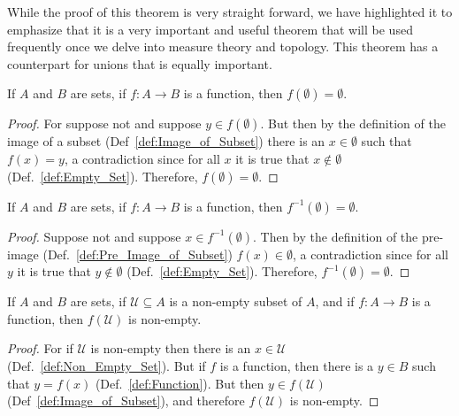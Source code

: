     While the proof of this theorem is very straight forward, we have
    highlighted it to emphasize that it is a very important and useful theorem
    that will be used frequently once we delve into measure theory and topology.
    This theorem has a counterpart for unions that is equally important.
    \begin{theorem}
        \label{thm:Image_of_Empty_Set_Is_Empty}%
        If $A$ and $B$ are sets, if $f:A\rightarrow{B}$ is a function,
        then $f(\emptyset)=\emptyset$.
    \end{theorem}
    \begin{proof}
        For suppose not and suppose $y\in{f}(\emptyset)$. But then by the
        definition of the image of a subset (Def~\ref{def:Image_of_Subset})
        there is an $x\in\emptyset$ such that $f(x)=y$, a contradiction since
        for all $x$ it is true that $x\notin\emptyset$
        (Def.~\ref{def:Empty_Set}). Therefore, $f(\emptyset)=\emptyset$.
    \end{proof}
    \begin{theorem}
        \label{thm:Pre_Image_of_Empty_Set_Is_Empty}%
        If $A$ and $B$ are sets, if $f:A\rightarrow{B}$ is a function, then
        $f^{\minus{1}}(\emptyset)=\emptyset$.
    \end{theorem}
    \begin{proof}
        Suppose not and suppose $x\in{f}^{\minus{1}}(\emptyset)$. Then by the
        definition of the pre-image (Def.~\ref{def:Pre_Image_of_Subset})
        $f(x)\in\emptyset$, a contradiction since for all $y$ it is true that
        $y\notin\emptyset$ (Def.~\ref{def:Empty_Set}). Therefore,
        $f^{\minus{1}}(\emptyset)=\emptyset$.
    \end{proof}
    \begin{theorem}
        \label{thm:Image_of_NonEmpty_Set_Is_NonEmpty}%
        If $A$ and $B$ are sets, if $\mathcal{U}\subseteq{A}$ is a non-empty
        subset of $A$, and if $f:A\rightarrow{B}$ is a function, then
        $f(\mathcal{U})$ is non-empty.
    \end{theorem}
    \begin{proof}
        For if $\mathcal{U}$ is non-empty then there is an $x\in\mathcal{U}$
        (Def.~\ref{def:Non_Empty_Set}). But if $f$ is a function, then there is
        a $y\in{B}$ such that $y=f(x)$ (Def.~\ref{def:Function}). But then
        $y\in{f}(\mathcal{U})$ (Def~\ref{def:Image_of_Subset}), and therefore
        $f(\mathcal{U})$ is non-empty.
    \end{proof}
